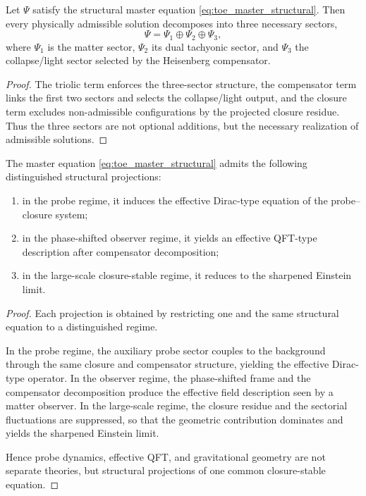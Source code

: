 \begin{corollary}
\label{cor:toe_triolic_realization}
Let $\Psi$ satisfy the structural master equation
\eqref{eq:toe_master_structural}. Then every physically admissible solution
decomposes into three necessary sectors,
\[
\Psi=\Psi_1\oplus\Psi_2\oplus\Psi_3,
\]
where $\Psi_1$ is the matter sector, $\Psi_2$ its dual tachyonic sector, and
$\Psi_3$ the collapse/light sector selected by the Heisenberg compensator.
\end{corollary}

\begin{proof}
The triolic term enforces the three-sector structure, the compensator term
links the first two sectors and selects the collapse/light output, and the
closure term excludes non-admissible configurations by the projected closure
residue. Thus the three sectors are not optional additions, but the necessary
realization of admissible solutions.
\end{proof}

\begin{corollary}
\label{cor:toe_structural_projections}
The master equation \eqref{eq:toe_master_structural} admits the following
distinguished structural projections:
\begin{enumerate}
\item in the probe regime, it induces the effective Dirac-type equation of the
probe--closure system;
\item in the phase-shifted observer regime, it yields an effective QFT-type
description after compensator decomposition;
\item in the large-scale closure-stable regime, it reduces to the sharpened
Einstein limit.
\end{enumerate}
\end{corollary}

\begin{proof}
Each projection is obtained by restricting one and the same structural
equation to a distinguished regime.

In the probe regime, the auxiliary probe sector couples to the background
through the same closure and compensator structure, yielding the effective
Dirac-type operator. In the observer regime, the phase-shifted frame and the
compensator decomposition produce the effective field description seen by a
matter observer. In the large-scale regime, the closure residue and the
sectorial fluctuations are suppressed, so that the geometric contribution
dominates and yields the sharpened Einstein limit.

Hence probe dynamics, effective QFT, and gravitational geometry are not
separate theories, but structural projections of one common closure-stable
equation.
\end{proof}

